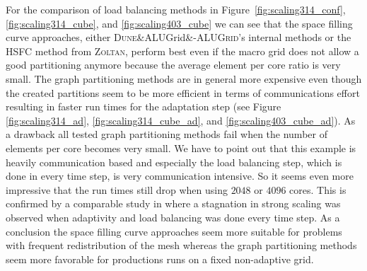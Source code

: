 \documentclass[10pt,notitlepage,a4paper]{article}
\newcommand{\dune}[1][]{\textsc{Dune}\ifx&#1&\else\textsc{-{#1}}\fi\xspace}
\newcommand{\zoltan}{\textsc{Zoltan}\xspace}
\begin{document}
For the comparison of load balancing methods in 
Figure~\ref{fig:scaling314_conf}, \ref{fig:scaling314_cube}, and \ref{fig:scaling403_cube} 
we can see that the
space filling curve approaches, either \dune[ALUGrid]'s internal methods 
or the HSFC method from \zoltan, 
perform best even if the macro grid does not allow a good partitioning
anymore because the average element per core ratio is very small. The graph
partitioning methods are in general more expensive even though the created partitions 
seem to be more efficient in terms of communications effort resulting in faster run
times for the adaptation step (see Figure \ref{fig:scaling314_ad},
\ref{fig:scaling314_cube_ad}, and \ref{fig:scaling403_cube_ad}).
As a drawback all tested graph partitioning methods fail when the number of elements per core 
becomes very small. We have to point out that this example is 
heavily communication based and especially
the load balancing step, which is done in every time step, is very communication
intensive. So it seems even more impressive that the run times still drop when 
using $2048$ or $4096$ cores. 
This is confirmed by a comparable study in \cite{amdis2} where a stagnation in strong
scaling was observed when adaptivity and load balancing was done every time step. 
As a conclusion the space filling curve approaches seem 
more suitable for problems with frequent redistribution of the mesh whereas the graph
partitioning methods seem more favorable for productions runs on a fixed non-adaptive
grid.
\end{document}
